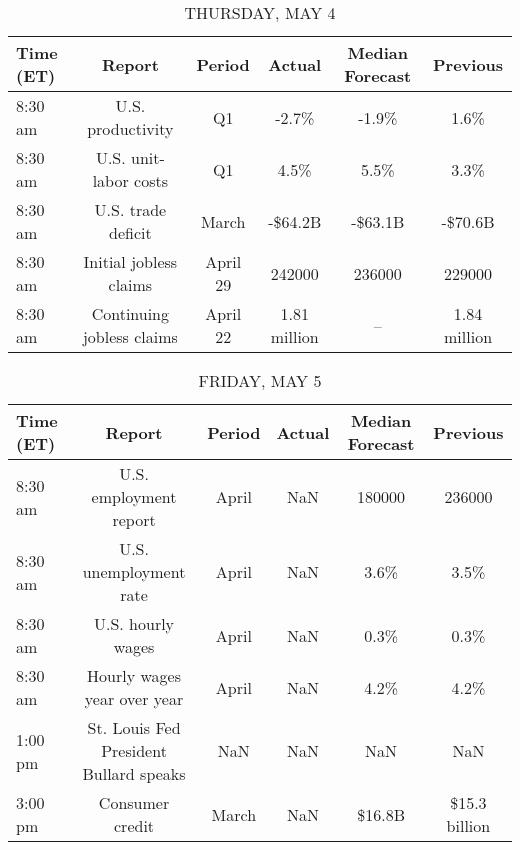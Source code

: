 \documentclass{article}%
\begin{document}
%


\begin{table}[htbp]%
\caption{THURSDAY, MAY 4}%
\centering%
\begin{adjustbox}{width=1\textwidth}%
\begin{tabular}{lccccc}
\toprule
Time (ET) &                    Report &   Period &       Actual & Median Forecast &     Previous \\
\midrule
  8:30 am &         U.S. productivity &       Q1 &        -2.7\% &           -1.9\% &         1.6\% \\
  8:30 am &     U.S. unit-labor costs &       Q1 &         4.5\% &            5.5\% &         3.3\% \\
  8:30 am &        U.S. trade deficit &    March &      -\$64.2B &         -\$63.1B &      -\$70.6B \\
  8:30 am &    Initial jobless claims & April 29 &       242000 &          236000 &       229000 \\
  8:30 am & Continuing jobless claims & April 22 & 1.81 million &              -- & 1.84 million \\
\bottomrule
\end{tabular}
%
\end{adjustbox}%
\end{table}

%


\begin{table}[htbp]%
\caption{FRIDAY, MAY 5}%
\centering%
\begin{adjustbox}{width=1\textwidth}%
\begin{tabular}{lccccc}
\toprule
Time (ET) &                                 Report & Period & Actual & Median Forecast &      Previous \\
\midrule
  8:30 am &                 U.S. employment report &  April &    NaN &          180000 &        236000 \\
  8:30 am &                 U.S. unemployment rate &  April &    NaN &            3.6\% &          3.5\% \\
  8:30 am &                      U.S. hourly wages &  April &    NaN &            0.3\% &          0.3\% \\
  8:30 am &            Hourly wages year over year &  April &    NaN &            4.2\% &          4.2\% \\
  1:00 pm & St. Louis Fed President Bullard speaks &    NaN &    NaN &             NaN &           NaN \\
  3:00 pm &                        Consumer credit &  March &    NaN &          \$16.8B & \$15.3 billion \\
\bottomrule
\end{tabular}
%
\end{adjustbox}%
\end{table}
\end{document}
